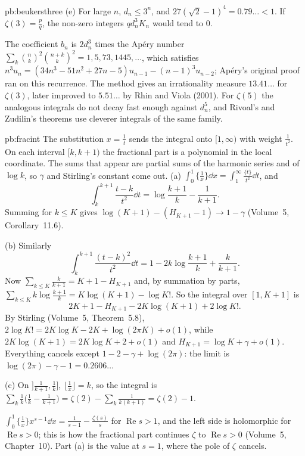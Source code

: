 \begin{solution}{pb:beukersthree}
(e) For large $n$, $d_n\le3^n$, and $27(\sqrt2-1)^4=0.79\ldots<1$. If $\zeta(3)=\frac pq$, the non-zero integers $qd_n^3K_n$ would tend to $0$.

\leads The coefficient $b_n$ is $2d_n^3$ times the Apéry number $\sum_k\binom nk^2\binom{n+k}k^2=1,5,73,1445,\dots$, which satisfies
$n^3u_n=(34n^3-51n^2+27n-5)u_{n-1}-(n-1)^3u_{n-2}$; Apéry's original proof ran on this recurrence. The method gives an irrationality
measure $13.41\ldots$ for $\zeta(3)$, later improved to $5.51\ldots$ by Rhin and Viola (2001). For $\zeta(5)$ the analogous integrals do
not decay fast enough against $d_n^5$, and Rivoal's and Zudilin's theorems use cleverer integrals of the same family.
\end{solution}

\begin{solution}{pb:fracint}
\idea The substitution $x=\frac1t$ sends the integral onto $[1,\infty)$ with weight $\frac1{t^2}$. On each interval $[k,k+1)$ the fractional part is a polynomial in the local coordinate. The sums that appear are partial sums of the harmonic series and of $\log k$, so $\gamma$ and Stirling's constant come out.
\writeup (a) $\int_0^1\{\frac1x\}\dd x=\int_1^\infty\frac{\{t\}}{t^2}\dd t$, and
\[
\int_k^{k+1}\frac{t-k}{t^2}\dd t=\log\frac{k+1}k-\frac1{k+1}.
\]
Summing for $k\le K$ gives $\log(K+1)-(H_{K+1}-1)\to1-\gamma$ (Volume~5, Corollary~11.6).

(b) Similarly
\[
\int_k^{k+1}\frac{(t-k)^2}{t^2}\dd t=1-2k\log\frac{k+1}k+\frac k{k+1}.
\]
Now $\sum_{k\le K}\frac k{k+1}=K+1-H_{K+1}$ and, by summation by parts,
$\sum_{k\le K}k\log\frac{k+1}k=K\log(K+1)-\log K!$. So the integral over $[1,K+1]$ is
\[
2K+1-H_{K+1}-2K\log(K+1)+2\log K!.
\]
By Stirling (Volume~5, Theorem~5.8), $2\log K!=2K\log K-2K+\log(2\pi K)+o(1)$, while $2K\log(K+1)=2K\log K+2+o(1)$ and $H_{K+1}=\log K+\gamma+o(1)$.
Everything cancels except $1-2-\gamma+\log(2\pi)$: the limit is $\log(2\pi)-\gamma-1=0.2606\ldots$

(c) On $]\frac1{k+1},\frac1k]$, $\lfloor\frac1x\rfloor=k$, so the integral is $\sum_k\frac1k\bigl(\frac1k-\frac1{k+1}\bigr)=\zeta(2)-\sum_k\frac1{k(k+1)}=\zeta(2)-1$.

\leads $\int_0^1\{\frac1x\}x^{s-1}\dd x=\frac1{s-1}-\frac{\zeta(s)}s$ for $\operatorname{Re}s>1$, and the left side is holomorphic for $\operatorname{Re}s>0$; this is how the
fractional part continues $\zeta$ to $\operatorname{Re}s>0$ (Volume~5, Chapter~10). Part (a) is the value at $s=1$, where the pole of $\zeta$ cancels.
\end{solution}

